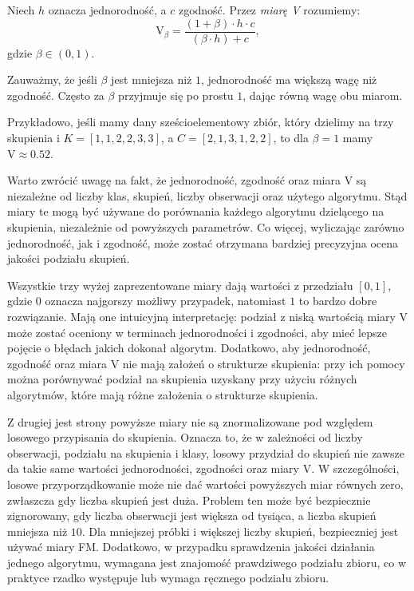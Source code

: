 \documentclass{praca1}
\begin{document}
\begin{definition}
Niech $h$ oznacza jednorodność, a $c$ zgodność. Przez \emph{miarę V} rozumiemy:
\begin{equation}
\textrm{V}_{\beta} = \frac{(1+\beta)\cdot h \cdot c}{(\beta \cdot h) + c},
\end{equation}
gdzie $\beta \in (0,1)$.
\end{definition}

Zauważmy, że jeśli $\beta$ jest mniejsza niż $1$, jednorodność ma większą wagę niż zgodność. Często za $\beta$ przyjmuje się po prostu $1$, dając równą wagę obu miarom.

Przykładowo, jeśli mamy dany sześcioelementowy zbiór, który dzielimy na trzy skupienia i $K = [1, 1, 2, 2, 3, 3]$, a $C = [2, 1, 3, 1, 2, 2]$, to dla $\beta = 1$ mamy $\textrm{V} \approx 0.52$.

Warto zwrócić uwagę na fakt, że jednorodność, zgodność oraz miara V są niezależne od liczby klas, skupień, liczby obserwacji oraz użytego algorytmu. Stąd miary te mogą być używane do porównania każdego algorytmu dzielącego na skupienia, niezależnie od powyższych parametrów. Co więcej, wyliczając zarówno jednorodność, jak i zgodność, może zostać otrzymana bardziej precyzyjna ocena jakości podziału skupień.


Wszystkie trzy wyżej zaprezentowane miary dają wartości z przedziału $[0, 1]$, gdzie $0$ oznacza najgorszy możliwy przypadek, natomiast $1$ to bardzo dobre rozwiązanie. Mają one intuicyjną interpretację: podział z niską wartością miary V może zostać oceniony w terminach jednorodności i zgodności, aby mieć lepsze pojęcie o błędach jakich dokonał algorytm. Dodatkowo, aby jednorodność, zgodność oraz miara V nie mają założeń o strukturze skupienia: przy ich pomocy można porównywać podział na skupienia uzyskany przy użyciu różnych algorytmów, które mają różne założenia o strukturze skupienia. 

Z drugiej jest strony powyższe miary nie są znormalizowane pod względem losowego przypisania do skupienia. Oznacza to, że w zależności od liczby obserwacji, podziału na skupienia i klasy, losowy przydział do skupień nie zawsze da takie same wartości jednorodności, zgodności oraz miary V. W szczególności, losowe przyporządkowanie może nie dać wartości powyższych miar równych zero, zwłaszcza gdy liczba skupień jest duża. Problem ten może być bezpiecznie zignorowany, gdy liczba obserwacji jest większa od tysiąca, a liczba skupień mniejsza niż $10$. Dla mniejszej próbki i większej liczby skupień, bezpieczniej jest używać miary FM.
Dodatkowo, w przypadku sprawdzenia jakości działania jednego algorytmu, wymagana jest znajomość prawdziwego podziału zbioru, co w praktyce rzadko występuje lub wymaga ręcznego podziału zbioru.
\end{document}
